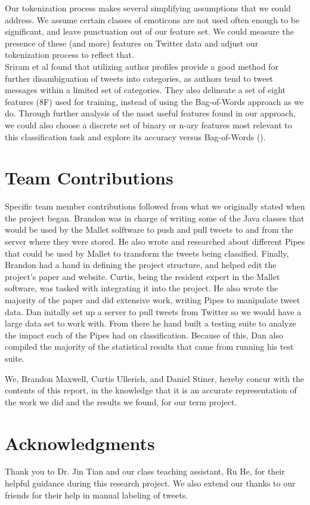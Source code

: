 \documentclass[letterpaper]{article}
\begin{document}
Our tokenization process makes several simplifying assumptions that we could address. We assume certain classes of emoticons are not used often enough to be significant, and leave punctuation out of our feature set. We could measure the presence of these (and more) features on Twitter data and adjust our tokenization process to reflect that.\\

Sriram et al found that utilizing author profiles provide a good method for further disambiguation of tweets into categories, as authors tend to tweet messages within a limited set of categories. They also delineate a set of eight features (8F) used for training, instead of using the Bag-of-Words approach as we do. Through further analysis of the most useful features found in our approach, we could also choose a discrete set of binary or n-ary features most relevant to this classification task and explore its accuracy versus Bag-of-Words (\citeauthor{Sriram:2010:STC:1835449.1835643}).

\section{Team Contributions}
Specific team member contributions followed from what we originally stated when the project began. Brandon was in charge of writing some of the Java classes that would be used by the Mallet solftware to push and pull tweets to and from the server where they were stored. He also wrote and researched about different Pipes that could be used by Mallet to transform the tweets being classified. Finally, Brandon had a hand in defining the project structure, and helped edit the project's paper and website. Curtis, being the resident expert in the Mallet software, was tasked with integrating it into the project. He also wrote the majority of the paper and did extensive work, writing Pipes to manipulate tweet data. Dan initally set up a server to pull tweets from Twitter so we would have a large data set to work with. From there he hand built a testing suite to analyze the impact each of the Pipes had on classification. Because of this, Dan also compiled the majority of the statistical results that came from running his test suite.

We, Brandon Maxwell, Curtis Ullerich, and Daniel Stiner, hereby concur with the contents of this report, in the knowledge that it is an accurate representation of the work we did and the results we found, for our term project.

\section{ Acknowledgments}
Thank you to Dr. Jin Tian and our class teaching assistant, Ru He, for their helpful guidance during this research project. We also extend our thanks to our friends for their help in manual labeling of tweets.





\end{document}

